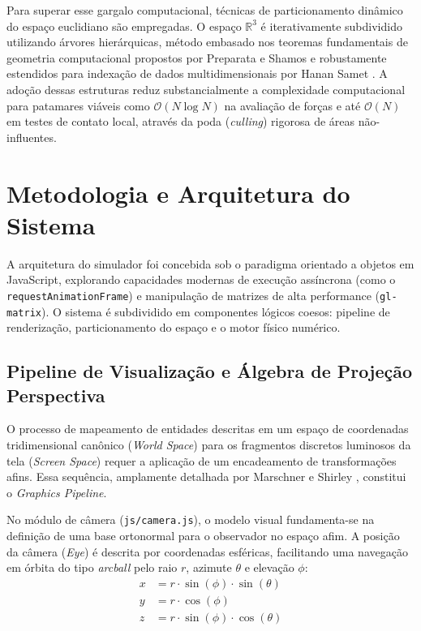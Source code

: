 \documentclass[11pt,a4paper]{article}
\begin{document}
Para superar esse gargalo computacional, técnicas de particionamento dinâmico do espaço euclidiano são empregadas. O espaço $\mathbb{R}^3$ é iterativamente subdividido utilizando árvores hierárquicas, método embasado nos teoremas fundamentais de geometria computacional propostos por Preparata e Shamos \cite{preparata} e robustamente estendidos para indexação de dados multidimensionais por Hanan Samet \cite{samet}. A adoção dessas estruturas reduz substancialmente a complexidade computacional para patamares viáveis como $\mathcal{O}(N \log N)$ na avaliação de forças e até $\mathcal{O}(N)$ em testes de contato local, através da poda (\textit{culling}) rigorosa de áreas não-influentes.

\section{Metodologia e Arquitetura do Sistema}

A arquitetura do simulador foi concebida sob o paradigma orientado a objetos em JavaScript, explorando capacidades modernas de execução assíncrona (como o \texttt{requestAnimationFrame}) e manipulação de matrizes de alta performance (\texttt{gl-matrix}). O sistema é subdividido em componentes lógicos coesos: pipeline de renderização, particionamento do espaço e o motor físico numérico.

\subsection{Pipeline de Visualização e Álgebra de Projeção Perspectiva}

O processo de mapeamento de entidades descritas em um espaço de coordenadas tridimensional canônico (\textit{World Space}) para os fragmentos discretos luminosos da tela (\textit{Screen Space}) requer a aplicação de um encadeamento de transformações afins. Essa sequência, amplamente detalhada por Marschner e Shirley \cite{shirley}, constitui o \textit{Graphics Pipeline}.

No módulo de câmera (\texttt{js/camera.js}), o modelo visual fundamenta-se na definição de uma base ortonormal para o observador no espaço afim. A posição da câmera (\textit{Eye}) é descrita por coordenadas esféricas, facilitando uma navegação em órbita do tipo \textit{arcball} pelo raio $r$, azimute $\theta$ e elevação $\phi$:
\begin{align}
    x &= r \cdot \sin(\phi) \cdot \sin(\theta) \\
    y &= r \cdot \cos(\phi) \\
    z &= r \cdot \sin(\phi) \cdot \cos(\theta)
\end{align}
\end{document}
